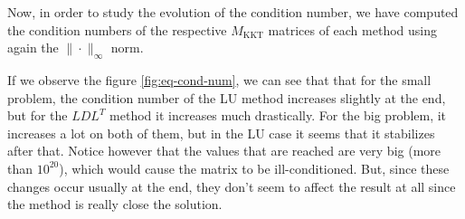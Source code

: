 \documentclass[11pt,a4paper]{article}
\begin{document}
Now, in order to study the evolution of the condition number, we have computed the condition numbers
of the respective $M_\text{KKT}$ matrices of each method using again the $\| \cdot \|_\infty$ norm.

If we observe the figure \ref{fig:eq-cond-num}, we can see that that for the small problem, the condition number
of the LU method increases slightly at the end, but for the $LDL^T$ method it increases much drastically.
For the big problem, it increases a lot on both of them, but in the LU case it seems that it stabilizes after that.
Notice however that the values that are reached are very big (more than $10^20$), which would cause the matrix to be
ill-conditioned. But, since these changes occur usually at the end, they don't seem to affect the result at all since
the method is really close the solution.
\end{document}
